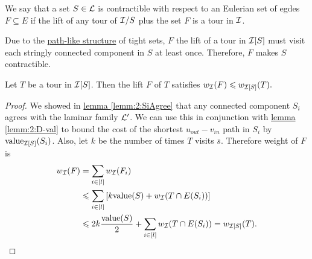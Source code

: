 \documentclass[./main.tex]{subfiles}
\begin{document}
	\begin{definition}
		We say that a set $S \in \mathcal{L}$ is contractible with respect to an Eulerian set of egdes $F \subseteq E$ if the lift of any tour of $\mathcal{I}/S$ plus the set $F$ is a tour in $\mathcal{I}$.\\
	\end{definition}
	
	Due to the \hyperref[fig:tightPath]{path-like structure} of tight sets, $F$ the lift of a tour in $\mathcal{I}[S]$ must visit each stringly connected component in $S$ at least once. Therefore, $F$ makes $S$ contractible.\\

	\begin{lemma}\label{lemm:3:lift-i}
		Let $T$ be a tour in $\mathcal{I}[S]$. Then the lift $F$ of $T$ satisfies $w_{\mathcal{I}}(F) \leqslant w_{\mathcal{I}[S]}(T).$
	\end{lemma}
	\begin{proof}
		We showed in \hyperref[lemm:2:SiAgree]{lemma \ref{lemm:2:SiAgree}} that any connected component $S_i$ agrees with the laminar family $\mathcal{L}'$. We can use this in conjunction with \hyperref[lemm:2:D-val]{lemma \ref{lemm:2:D-val}} to bound the cost of the shortest $u_{out} - v_{in}$ path in $S_i$ by $\textup{value}_{\mathcal{I}[S]}(S_i)$. Also, let $k$ be the number of times $T$ visits $\bar{s}$. Therefore weight of $F$ is
		\begin{align*}
			w_{\mathcal{I}}(F) &= \sum_{i \in [l]} w_{\mathcal{I}}(F_i)\\
			&\leqslant \sum_{i \in [l]} \left[k\textup{value}(S) + w_{\mathcal{I}}(T \cap E(S_i))\right]\\
			&\leqslant 2k \frac{\textup{value}(S)}{2} + \sum_{i \in [l]}w_{\mathcal{I}}(T \cap E(S_i)) = w_{\mathcal{I}[S]}(T).
		\end{align*}
	\end{proof}
\end{document}
